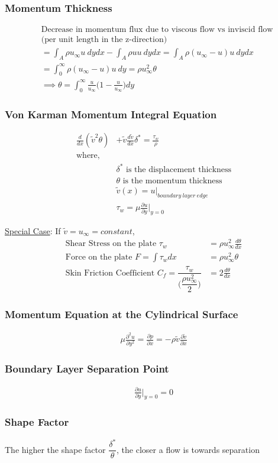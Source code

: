 \documentclass[11pt, letterpaper, notitlepage]{article}
\begin{document}
\subsubsection{Momentum Thickness}
\begin{align*}
& \text{Decrease in momentum flux due to viscous flow vs inviscid flow} \\
& \text{(per unit length in the z-direction)} \\
&= \int_A \rho u_\infty u \ dy dx - \int_A \rho u u \ dy dx = \int_A \rho (u_\infty - u) u\ dy dx \\
&= \int_0^\infty \rho (u_\infty-u) u \ dy = \rho u^2_\infty \theta \\
& \implies \boxed{\theta = \int_0^\infty \frac{u}{u_\infty} \biggl(1-\frac{u}{u_\infty} \biggr) dy}
\end{align*}

\subsubsection{Von Karman Momentum Integral Equation}
\begin{align*}
\frac{d}{d x} (\tilde{v}^2 \theta) &+ \tilde{v} \frac{d \tilde{v}}{dx} \delta^* = \frac{\tau_w}{\rho} \\
\text{where, }& \\
& \delta^* \text{ is the displacement thickness} \\
& \theta \text{ is the momentum thickness} \\
& \tilde{v}(x) = u \rvert_{boundary\ layer\ edge} \\
& \tau_w = \mu \frac{\partial u}{\partial y} \biggr\rvert_{y=0}
\end{align*}

\underline{Special Case}: If $\tilde{v} = u_{\infty} = constant$,
\begin{align*}
\text{Shear Stress on the plate } \tau_w &= \rho u_{\infty}^2 \frac{d \theta}{d x} \\
\text{Force on the plate } F = \int \tau_w dx &= \rho u_{\infty}^2 \theta \\
\text{Skin Friction Coefficient } C_f = \dfrac{\tau_w}{\biggl(\dfrac{\rho u_{\infty}^2}{2}\biggr)} &= 2 \frac{d \theta}{d x}
\end{align*}

\subsubsection{Momentum Equation at the Cylindrical Surface}
\begin{align*}
\mu \frac{\partial^2 u}{\partial y^2} = \frac{\partial p}{\partial x} = - \rho \tilde{v} \frac{\partial \tilde{v}}{\partial x}
\end{align*}

\subsubsection{Boundary Layer Separation Point}
\begin{align*}
\frac{\partial u}{\partial y} \biggr\rvert_{y=0} = 0
\end{align*}

\subsubsection{Shape Factor}
The higher the shape factor $\dfrac{\delta^*}{\theta}$, the closer a flow is towards separation
\end{document}
